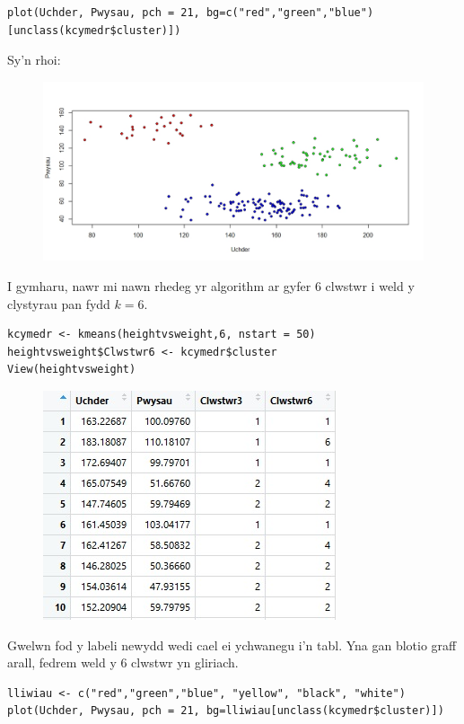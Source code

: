 \begin{verbatim}
plot(Uchder, Pwysau, pch = 21, bg=c("red","green","blue")[unclass(kcymedr$cluster)])
\end{verbatim}

Sy'n rhoi:

\begin{figure}[H]
\begin{center}
\includegraphics[width=0.5\linewidth]{../img/3clwstwrR.jpeg}
\end{center}
\end{figure}

I gymharu, nawr mi nawn rhedeg yr algorithm ar gyfer 6 clwstwr i weld y clystyrau pan fydd $k=6$. 

\begin{verbatim}
kcymedr <- kmeans(heightvsweight,6, nstart = 50)
heightvsweight$Clwstwr6 <- kcymedr$cluster
View(heightvsweight)
\end{verbatim}

\begin{figure}[H]
\begin{center}
\includegraphics[width=0.5\linewidth]{../img/Data6_yn_R.jpg}
\end{center}
\end{figure}

Gwelwn fod y labeli newydd wedi cael ei ychwanegu i'n tabl. Yna gan blotio graff arall, fedrem weld y 6 clwstwr yn gliriach.

\begin{verbatim}
lliwiau <- c("red","green","blue", "yellow", "black", "white")
plot(Uchder, Pwysau, pch = 21, bg=lliwiau[unclass(kcymedr$cluster)])
\end{verbatim}

